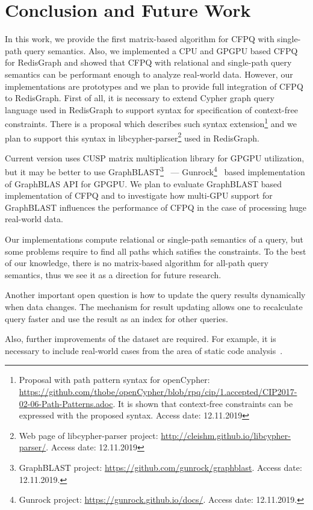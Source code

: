\section{Conclusion and Future Work}
In this work, we provide the first matrix-based algorithm for CFPQ with single-path query semantics.
Also, we implemented a CPU and GPGPU based CFPQ for RedisGraph and showed that CFPQ with relational and single-path query semantics can be performant enough to analyze real-world data.
However, our implementations are prototypes and we plan to provide full integration of CFPQ to RedisGraph.
First of all, it is necessary to extend Cypher graph query language used in RedisGraph to support syntax for specification of context-free constraints.
There is a proposal which describes such syntax extension\footnote{Proposal with path pattern syntax for openCypher: \url{https://github.com/thobe/openCypher/blob/rpq/cip/1.accepted/CIP2017-02-06-Path-Patterns.adoc}. It is shown that context-free constraints can be expressed with the proposed syntax. Access date: 12.11.2019} and we plan to support this syntax in libcypher-parser\footnote{Web page of libcypher-parser project: \url{http://cleishm.github.io/libcypher-parser/}. Access date: 12.11.2019} used in RedisGraph.

Current version uses CUSP matrix multiplication library for GPGPU utilization, but it may be better to use GraphBLAST\footnote{GraphBLAST project: \url{https://github.com/gunrock/graphblast}. Access date: 12.11.2019.}~\cite{yang2019graphblast} --- Gunrock\footnote{Gunrock project: \url{https://gunrock.github.io/docs/}. Access date: 12.11.2019.}~\cite{Wang:2017:GGG:3131890.3108140} based implementation of GraphBLAS API for GPGPU.
We plan to evaluate GraphBLAST based implementation of CFPQ and to investigate how multi-GPU support for GraphBLAST influences the performance of CFPQ in the case of processing huge real-world data.

Our implementations compute relational or single-path semantics of a query, but some problems require to find all paths which satifies the constraints.
To the best of our knowledge, there is no matrix-based algorithm for all-path query semantics, thus we see it as a direction for future research.

Another important open question is how to update the query results dynamically when data changes.
The mechanism for result updating allows one to recalculate query faster and use the result as an index for other queries.

Also, further improvements of the dataset are required.
For example, it is necessary to include real-world cases from the area of static code analysis~\cite{Zheng:2008:DAA:1328897.1328464,veduradabatch,LPAR-21:Cauliflower_Solver_Generator_for}.
